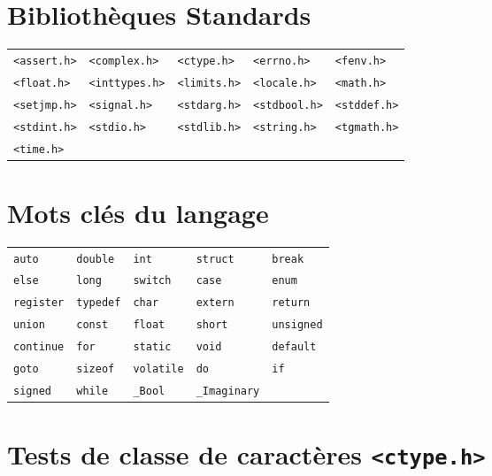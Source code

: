 \documentclass{article}
\newcommand{\cd}{\lstinline}
\begin{document}
\begin{multicols*}{3}
\section*{Bibliothèques Standards}
  \begin{tabularx}{\linewidth}{XXXXX}
    \cd{<assert.h>} & \cd{<complex.h>}  & \cd{<ctype.h>}  & \cd{<errno.h>}   & \cd{<fenv.h>} \\
    \cd{<float.h>}  & \cd{<inttypes.h>} & \cd{<limits.h>} & \cd{<locale.h>}  & \cd{<math.h>} \\
    \cd{<setjmp.h>} & \cd{<signal.h>}   & \cd{<stdarg.h>} & \cd{<stdbool.h>} & \cd{<stddef.h>} \\
    \cd{<stdint.h>} & \cd{<stdio.h>}    & \cd{<stdlib.h>} & \cd{<string.h>}  & \cd{<tgmath.h>} \\
    \cd{<time.h>}   &              &            &             & \\
  \end{tabularx}

\section*{Mots clés du langage}
  \begin{tabularx}{\linewidth}{XXXXX}
    \cd{auto} & \cd{double}  & \cd{int}  & \cd{struct}   & \cd{break} \\
    \cd{else}  & \cd{long} & \cd{switch} & \cd{case}  & \cd{enum} \\
    \cd{register} & \cd{typedef}   & \cd{char} & \cd{extern} & \cd{return} \\
    \cd{union} & \cd{const}    & \cd{float} & \cd{short}  & \cd{unsigned} \\
    \cd{continue}   & \cd{for} & \cd{static} & \cd{void} & \cd{default} \\
    \cd{goto} & \cd{sizeof} & \cd{volatile} & \cd{do} & \cd{if} \\
    \cd{signed} & \cd{while} & \cd{_Bool} & \cd{_Imaginary} \\
  \end{tabularx}
\section*{Tests de classe de caractères \texttt{<ctype.h>}}


\end{multicols*}
\end{document}
